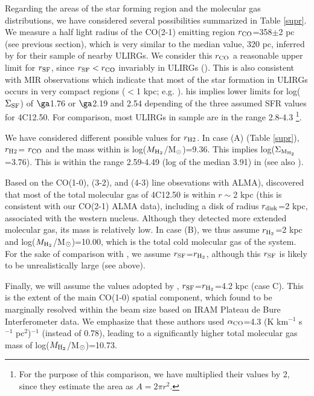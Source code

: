 \documentclass{aa}
\begin{document}
Regarding the areas of the star forming region and the molecular gas distributions, we have considered several possibilities  summarized in Table \ref{supr}.
 We measure a half light radius  of the CO(2-1) emitting region $r_{\rm CO}$=358$\pm$2 pc (see previous section), which  is very similar  to  the median value, 320 pc, inferred by \cite{Pereira2021} for their  sample of nearby ULIRGs.  We  consider  this $r_{\rm CO}$ a reasonable upper limit for $r_{\rm SF}$, since $r_{\rm SF}<r_{\rm CO}$ invariably in ULIRGs (\citealt{Pereira2021}). 
This is also consistent  with  MIR observations which indicate that most of the star formation in ULIRGs occurs in  very compact regions ($<$1 kpc; e.g. \citealt{Soifer2000,Diaz2010,Alonso2016}).  his implies  lower  limits for log($\Sigma_{\rm SF}$) of $\ga$1.76 or $\ga$2.19 and 2.54 depending of the three assumed SFR values for 4C12.50. For comparison, most ULIRGs  in \cite{Pereira2021} sample are in the range 2.8-4.3 \footnote{For the purpose of this comparison, we have multiplied their values by 2, since they estimate the area as $A=2 \pi r^2$.}.  

We have considered different possible values for $r_{\rm H2}$. In case (A)  (Table \ref{supr}), $r_{\rm H2}$= $r_{\rm CO}$ and the mass within is log($M_{\rm H_2}$/M$_{\rm \odot}$)=9.36.  This implies log($\Sigma_{\rm M_{H_2}}$=3.76). This is within the range  2.59-4.49 (log of the median  3.91) in \cite{Pereira2021}   (see also \citealt{Bellocchi2022}). 

 Based on the CO(1-0), (3-2), and (4-3) line obsevations with ALMA), \cite{Fotopoulou2019} discovered that most of the total  molecular gas of 4C12.50 is within  $r\sim$2 kpc (this is consistent with our CO(2-1) ALMA data), including   a  disk of radius $r_{\rm disk}$=2 kpc, associated with the western nucleus. Although they detected more extended molecular gas, its mass is relatively low. In case (B), we thus assume $r_{\rm H_2}$=2 kpc and log($M_{\rm H_2}$/M$_{\rm \odot}$)=10.00, which is the total cold molecular gas of the system. For the sake of comparison with \cite{Lanz2016}, we assume  $r_{\rm SF}$=$r_{\rm H_2}$, although this $r_{\rm SF}$ is  likely to be unrealistically large (see above).  

Finally, we will assume  the values adopted by \cite{Lanz2016}, $r_{\rm SF}$=$r_{\rm H_2}$=4.2 kpc (case C). This  is the extent of the main CO(1-0) spatial component, which  \cite{Dasyra2014} found to be marginally resolved within the beam size based on IRAM Plateau de Bure Interferometer data.  We emphasize that these authors used $\alpha_{\rm CO}$=4.3 (K km$^{-1}$ s$^{-1}$ pc$^2$)$^{-1}$ (instead of 0.78), leading to a significantly higher total molecular gas mass of log($M_{\rm H_2}$/M$_{\rm \odot}$)=10.73. 
\end{document}
